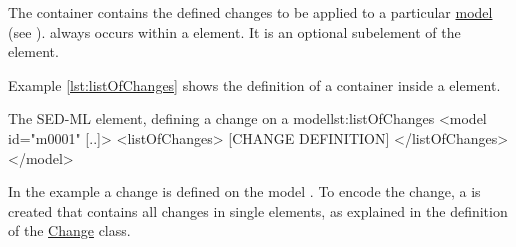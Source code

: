 \label{sec:listOfChanges}
%
%
The  container contains the defined changes to be applied to a particular \hyperref[class:model]{model} (see ).  always occurs within a  element. It is an optional subelement of the  element.

Example \ref{lst:listOfChanges} shows the definition of a  container inside a  element.
\begin{myXmlLst}{The SED-ML  element, defining a change on a model}{lst:listOfChanges}
<model id="m0001" [..]>
 <listOfChanges>
  [CHANGE DEFINITION]
 </listOfChanges>
</model>
\end{myXmlLst}
%
In the example a change is defined on the model . To encode the change, a  is created that contains all changes in single  elements, as explained in the definition of the \hyperref[class:change]{Change} class.

